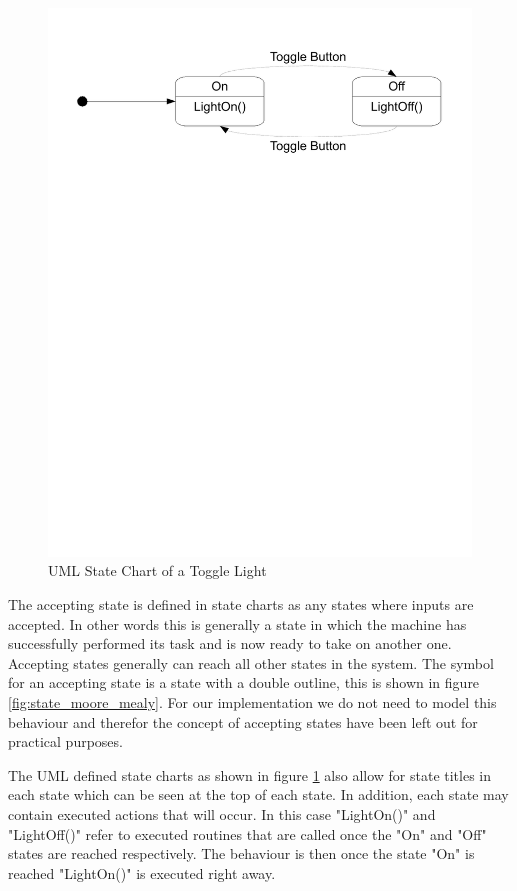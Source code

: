 \begin{figure}[htp]
    \centering
    \includegraphics[trim= 15mm 200mm 15mm 10mm, clip, width=\imgmedium]{./images/state_uml_light.pdf} 
    \caption{UML State Chart of a Toggle Light}
    \label{fig:state_uml_light}
\end{figure}

The accepting state is defined in state charts as any states where inputs are accepted. In other words this is generally a state in which the machine has successfully performed its task and is now ready to take on another one. Accepting states generally can reach all other states in the system. The symbol for an accepting state is a state with a double outline, this is shown in figure \ref{fig:state_moore_mealy}. For our implementation we do not need to model this behaviour and therefor the concept of accepting states have been left out for practical purposes.

The UML defined state charts as shown in figure \ref{fig:state_uml_light} also allow for state titles in each state which can be seen at the top of each state. In addition, each state may contain executed actions that will occur. In this case "LightOn()" and "LightOff()" refer to executed routines that are called once the "On" and "Off" states are reached respectively. The behaviour is then once the state "On" is reached "LightOn()" is executed right away.

